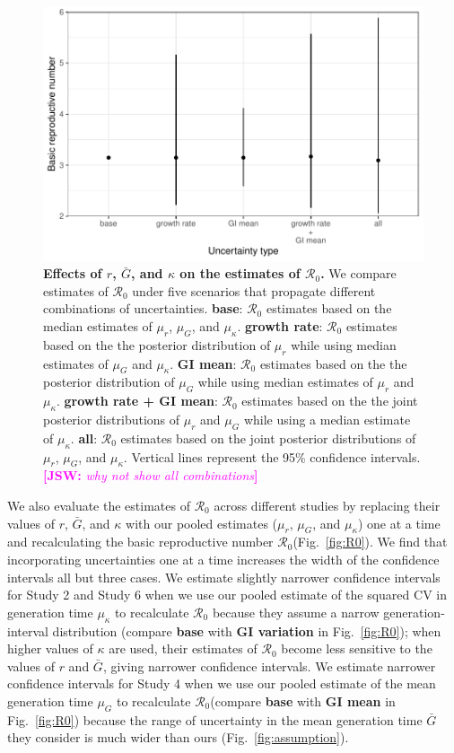 \documentclass[12pt]{article}
\newcommand{\fref}[1]{Fig.~\ref{fig:#1}}
\newcommand{\Rx}[1]{\ensuremath{{\mathcal R}_{#1}}}
\newcommand{\Ro}{\Rx{0}\xspace}
\newcommand{\comment}[3]{\textcolor{#1}{\textbf{[#2: }\textsl{#3}\textbf{]}}}
\newcommand{\jsw}[1]{\comment{magenta}{JSW}{#1}}
\begin{document}
\begin{figure}[!ht]
\includegraphics[width=\textwidth]{figure2.pdf}
\caption{
\textbf{Effects of $r$, $\bar G$, and $\kappa$ on the estimates of \Ro.}
We compare estimates of \Ro under five scenarios that propagate different combinations of uncertainties.
\textbf{base}: \Ro estimates based on the median estimates of $\mu_r$, $\mu_G$, and $\mu_\kappa$.
\textbf{growth rate}: \Ro estimates based on the the posterior distribution of $\mu_r$ while using median estimates of $\mu_G$ and $\mu_\kappa$.
\textbf{GI mean}: \Ro estimates based on the the posterior distribution of $\mu_G$ while using median estimates of $\mu_r$ and $\mu_\kappa$.
\textbf{growth rate + GI mean}: \Ro estimates based on the the joint posterior distributions of $\mu_r$ and $\mu_G$ while using a median estimate of $\mu_\kappa$.
\textbf{all}: \Ro estimates based on the joint posterior distributions of  $\mu_r$, $\mu_G$, and $\mu_\kappa$.
Vertical lines represent the 95\% confidence intervals.
\jsw{why not show all combinations}
}
\label{fig:eff}
\end{figure}

We also evaluate the estimates of \Ro across different studies by 
replacing their values of $r$, $\bar G$, and $\kappa$ with our pooled estimates ($\mu_r$, $\mu_G$, and $\mu_\kappa$) one at a time and recalculating the basic reproductive number \Ro (\fref{R0}).
We find that incorporating uncertainties one at a time increases the width of the confidence intervals all but three cases.
We estimate slightly narrower confidence intervals for Study 2 and Study 6 when we use our pooled estimate of the squared CV in generation time $\mu_\kappa$ to recalculate \Ro because they assume a narrow generation-interval distribution (compare \textbf{base} with \textbf{GI variation} in \fref{R0});
when higher values of $\kappa$ are used, their estimates of \Ro become less sensitive to the values of $r$ and $\bar G$, giving narrower confidence intervals.
We estimate narrower confidence intervals for Study 4 when we use our pooled estimate of the mean generation time $\mu_G$ to recalculate \Ro (compare \textbf{base} with \textbf{GI mean} in \fref{R0}) because the range of uncertainty in the mean generation time $\bar G$ they consider is much wider than ours (\fref{assumption}).
\end{document}
